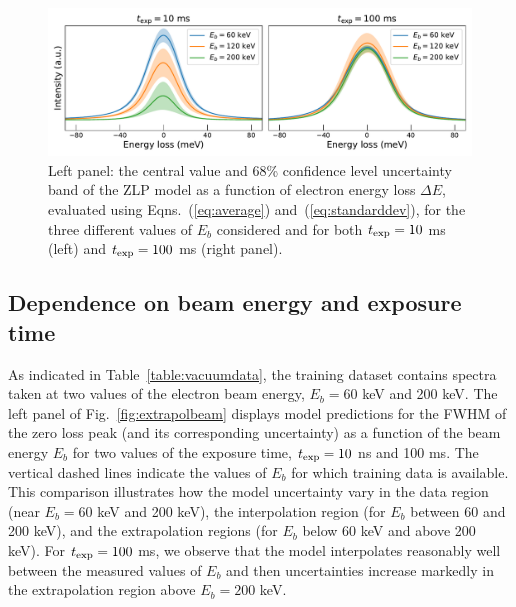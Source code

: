 \begin{figure}[t]
    \centering
    \includegraphics[width=170mm]{plots/deltaE_dependence_vacuum.pdf}
    \caption{Left panel: the central value and 68\% confidence level uncertainty band of the ZLP model as a function
      of electron energy loss $\Delta E$,
      evaluated using Eqns.~(\ref{eq:average}) and~(\ref{eq:standarddev}), for
      the three different values of $E_b$ considered and for both
      $t_{\rm exp}=10$ ms (left)  and $t_{\rm exp}=100$ ms (right panel).
      \label{fig:EELS_vacuum_DeltaE}}
\end{figure}

\subsection{Dependence on  beam energy  and exposure time }
\label{eq:depebeam}


As indicated in Table~\ref{table:vacuumdata}, the training dataset contains
spectra taken at two values of the electron beam energy, $E_b=60$ keV and 200 keV.
%
The left panel of Fig.~\ref{fig:extrapolbeam} displays  model predictions for the FWHM of the zero loss peak
      (and its corresponding uncertainty) as a function of the beam energy $E_b$
      for two values of the exposure time, $t_{\rm exp}=10$ ns and 100 ms.
      The vertical dashed lines indicate the values of $E_b$ for which training data is available.
      This comparison illustrates how the model uncertainty vary in the data region
      (near $E_b=60$ keV and 200 keV), the interpolation region (for $E_b$ between 60 and 200 keV),
      and the extrapolation regions (for $E_b$ below 60 keV and above 200 keV).
      For $t_{\rm exp}=100$ ms, we observe that the model interpolates reasonably well
      between the measured values of $E_b$ and then uncertainties increase
      markedly in the extrapolation region above $E_b=200$ keV.
      
